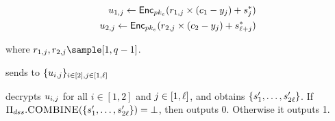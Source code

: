 \begin{algorithm}
\begin{algorithmic}[1]
\begin{eqnarray*}
\secretShareEncryption{1, \projIdx} \assign \pkencrypt[\encryptPubKey](\genericRand[1, \projIdx] \times (\ciphertext[1] - \genericCInputElmt{\projIdx})  + s_{\projIdx}^{\ast}) \\
\secretShareEncryption{2, \projIdx} \assign \pkencrypt[\encryptPubKey](\genericRand[2, \projIdx] \times (\ciphertext[2] - \genericCInputElmt{\projIdx})  + s_{\genericVecLen + \projIdx}^{\ast})
\end{eqnarray*}

where $\genericRand[1, \projIdx], \genericRand[2, \projIdx] \sample [1, \groupOrder - 1]$. 


\EndFor

\State \client sends to \server $\{\secretShareEncryption{\tblIdx,\projIdx}\}_{\tblIdx \in [2], \projIdx \in [1, \genericVecLen]}$


\Statex {}


\State \server decrypts $\secretShareEncryption{i, \projIdx}$ for all $i \in [1,2]$ and $j \in [1,\ell]$, and obtains $\{ s_1', \dots, s_{2\ell}'\}$. If $\Pi_{dss}.\textsc{COMBINE}(\{ s_1', \dots, s_{2\ell}'\}) = \bot$, then \server outputs $0$. Otherwise it outputs 1. 



\EndProcedure




\end{algorithmic}
\end{algorithm}






